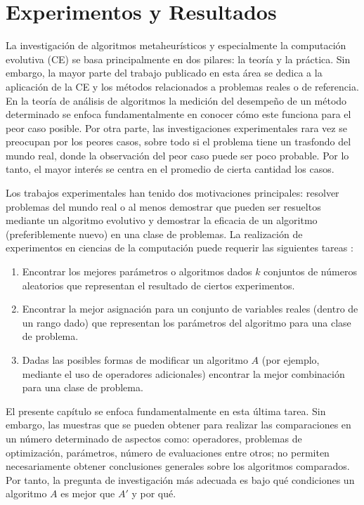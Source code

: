 \chapter{Experimentos y Resultados} \label{Chapter7}

La investigación de algoritmos metaheurísticos y especialmente la computación evolutiva (CE) se basa principalmente en dos pilares: la teoría y la práctica. Sin embargo, la mayor parte del trabajo publicado en esta área se dedica a la aplicación de la CE y los métodos relacionados a problemas reales o de referencia. En la teoría de análisis de algoritmos la medición del desempeño de un método determinado se enfoca fundamentalmente en conocer cómo este funciona para el peor caso posible. Por otra parte, las investigaciones experimentales rara vez se preocupan por los peores casos, sobre todo si el problema tiene un trasfondo del mundo real, donde la observación del peor caso puede ser poco probable. Por lo tanto, el mayor interés se centra en el promedio de cierta cantidad los casos.

 Los trabajos experimentales han tenido dos motivaciones principales: resolver problemas del mundo real o al menos demostrar que pueden ser resueltos mediante un algoritmo evolutivo y demostrar la eficacia de un algoritmo (preferiblemente nuevo) en una clase de problemas. La realización de experimentos en ciencias de la computación puede requerir las siguientes tareas \cite{BartzBeielstein2014ExperimentalAO}:
\begin{enumerate}
	\item Encontrar los mejores parámetros o algoritmos dados $k$ conjuntos de números aleatorios que representan el resultado de ciertos experimentos.
	\item  Encontrar la mejor asignación para un conjunto de variables reales (dentro de un rango dado) que representan los parámetros del algoritmo para una clase de problema.
	\item Dadas las posibles formas de modificar un algoritmo $A$ (por ejemplo, mediante el uso de operadores adicionales) encontrar la mejor combinación para una clase de problema.
\end{enumerate}
El presente capítulo se enfoca fundamentalmente en esta última tarea. Sin embargo, las muestras que se pueden obtener para realizar las comparaciones en un número determinado de aspectos como: operadores, problemas de optimización, parámetros, número de evaluaciones entre otros; no permiten necesariamente obtener conclusiones generales sobre los algoritmos comparados. Por tanto, la pregunta de investigación más adecuada es bajo qué condiciones  un algoritmo $A$ es mejor que $A'$ y por qué. 

